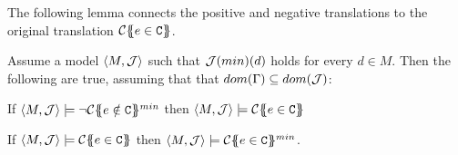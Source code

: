 The following lemma connects the positive and negative translations to 
the original translation ${\cal C}\{\!\!\{e \in {\tt C}\}\!\!\}$. 

\begin{lemma}\label{lem:contract-min} Assume a model $\langle M,{\cal J}\rangle$ such that ${\cal J}(min)(d)$ holds for every $d \in M$. 
Then the following are true, assuming that that $dom(\Gamma) \subseteq dom({\cal J})$:
\begin{itemize*} 
  \item If $\langle M,{\cal J}\rangle \models \neg {\cal C}\{\!\!\{e \notin {\tt C}\}\!\!\}^{min}$ then $\langle M,{\cal J}\rangle\models {\cal C}\{\!\!\{e \in {\tt C}\}\!\!\}$
  \item If $\langle M,{\cal J}\rangle \models {\cal C}\{\!\!\{e \in {\tt C}\}\!\!\}$ then $\langle M,{\cal J}\rangle \models {\cal C}\{\!\!\{e \in {\tt C}\}\!\!\}^{min}$.
\end{itemize*}
\end{lemma}

